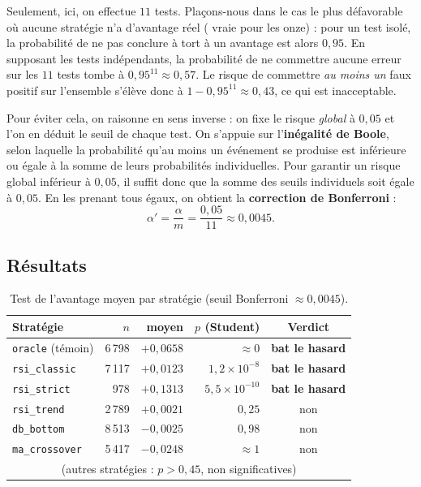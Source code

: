 Seulement, ici, on effectue \(11\) tests. Plaçons-nous dans le cas le plus
défavorable où aucune stratégie n'a d'avantage réel (\Hzero{} vraie pour
les onze) : pour un test isolé, la probabilité de ne pas conclure à tort à
un avantage est alors \(0{,}95\). En supposant les tests indépendants, la
probabilité de ne commettre aucune erreur sur les \(11\) tests tombe à
\(0{,}95^{11} \approx 0{,}57\). Le risque de commettre \emph{au moins un}
faux positif sur l'ensemble s'élève donc à
\(1 - 0{,}95^{11} \approx 0{,}43\), ce qui est inacceptable.

Pour éviter cela, on raisonne en sens inverse : on fixe le risque
\emph{global} à \(0{,}05\) et l'on en déduit le seuil de chaque test.
On s'appuie sur l'\textbf{inégalité de Boole}, selon laquelle la
probabilité qu'au moins un événement se produise est inférieure ou égale
à la somme de leurs probabilités individuelles. Pour garantir un risque
global inférieur à \(0{,}05\), il suffit donc que la somme des seuils
individuels soit égale à \(0{,}05\). En les prenant tous égaux, on obtient
la \textbf{correction de Bonferroni} :
\[
  \alpha' = \frac{\alpha}{m} = \frac{0{,}05}{11} \approx 0{,}0045 .
\]

\subsection{Résultats}
\begin{table}[H]
\centering
\caption{Test de l'avantage moyen par stratégie (seuil Bonferroni $\approx 0{,}0045$).}
\label{tab:b1-etape1}
\small
\begin{tabular}{@{}lrrrc@{}}
\toprule
Stratégie & $n$ & \edgevar{} moyen & $p$ (Student) & Verdict \\
\midrule
\texttt{oracle} (témoin) & 6\,798 & $+0{,}0658$ & $\approx 0$    & \textbf{bat le hasard} \\
\midrule
\texttt{rsi\_classic} & 7\,117 & $+0{,}0123$ & $1{,}2\times10^{-8}$  & \textbf{bat le hasard} \\
\texttt{rsi\_strict}  &   978  & $+0{,}1313$ & $5{,}5\times10^{-10}$ & \textbf{bat le hasard} \\
\texttt{rsi\_trend}   & 2\,789 & $+0{,}0021$ & $0{,}25$             & non \\
\texttt{db\_bottom}   & 8\,513 & $-0{,}0025$ & $0{,}98$             & non \\
\texttt{ma\_crossover}& 5\,417 & $-0{,}0248$ & $\approx 1$          & non \\
\multicolumn{5}{c}{\footnotesize (autres stratégies : $p>0{,}45$, non significatives)} \\
\bottomrule
\end{tabular}
\end{table}

